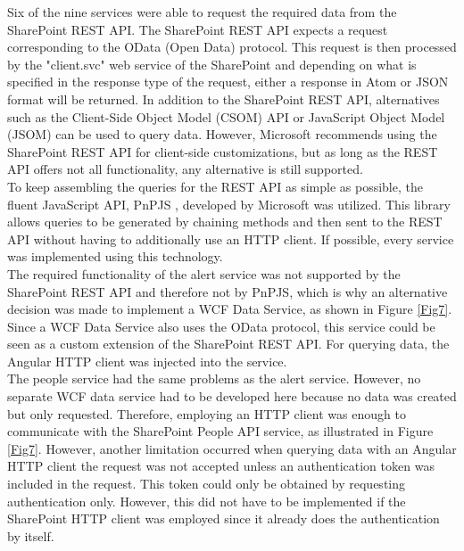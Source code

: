 \documentclass[Bachelor,BIF,english]{twbook}
\begin{document}
Six of the nine services were able to request the required data from the SharePoint REST API. The SharePoint REST API expects a request corresponding to the OData (Open Data) protocol. This request is then processed by the "client.svc" web service of the SharePoint and depending on what is specified in the response type of the request, either a response in Atom or JSON format will be returned. In addition to the SharePoint REST API, alternatives such as the Client-Side Object Model (CSOM) API \cite{CSOM} or JavaScript Object Model (JSOM) \cite{JSOM} can be used to query data. However, Microsoft recommends using the SharePoint REST API for client-side customizations, but as long as the REST API offers not all functionality, any alternative is still supported.
\\[\baselineskip]
To keep assembling the queries for the REST API as simple as possible, the fluent JavaScript API, PnPJS \cite{Pnpjs}, developed by Microsoft was utilized. This library allows queries to be generated by chaining methods and then sent to the REST API without having to additionally use an HTTP client. If possible, every service was implemented using this technology.
\\[\baselineskip]
The required functionality of the alert service was not supported by the SharePoint REST API and therefore not by PnPJS, which is why an alternative decision was made to implement a WCF Data Service, as shown in Figure \ref{Fig7}. Since a WCF Data Service also uses the OData protocol, this service could be seen as a custom extension of the SharePoint REST API. For querying data, the Angular HTTP client was injected into the service.
\\[\baselineskip]
The people service had the same problems as the alert service. However, no separate WCF data service had to be developed here because no data was created but only requested. Therefore, employing an HTTP client was enough to communicate with the SharePoint People API service, as illustrated in Figure \ref{Fig7}. However, another limitation occurred when querying data with an Angular HTTP client the request was not accepted unless an authentication token was included in the request. This token could only be obtained by requesting authentication only. However, this did not have to be implemented if the SharePoint HTTP client was employed since it already does the authentication by itself.
\\[\baselineskip]
\end{document}
